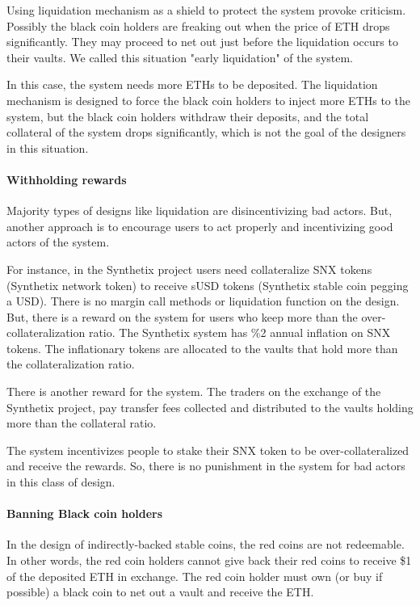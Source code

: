 Using liquidation mechanism as a shield to protect the system provoke criticism. Possibly the black coin holders are freaking out when the price of ETH drops significantly. They may proceed to net out just before the liquidation occurs to their vaults. We called this situation "early liquidation" of the system. 

In this case, the system needs more ETHs to be deposited. The liquidation mechanism is designed to force the black coin holders to inject more ETHs to the system, but the black coin holders withdraw their deposits, and the total collateral of the system drops significantly, which is not the goal of the designers in this situation.

\paragraph{Withholding rewards}

Majority types of designs like liquidation are disincentivizing bad actors. But, another approach is to encourage users to act properly and incentivizing good actors of the system.

For instance, in the Synthetix project users need collateralize SNX tokens (Synthetix network token) to receive sUSD tokens (Synthetix stable coin pegging a USD). There is no margin call methods or liquidation function on the design. But, there is a reward on the system for users who keep more than the over-collateralization ratio. 
The Synthetix system has \%2 annual inflation on SNX tokens. The inflationary tokens are allocated to the vaults that hold more than the collateralization ratio.

There is another reward for the system. The traders on the exchange of the Synthetix project, pay transfer fees collected and distributed to the vaults holding more than the collateral ratio.

The system incentivizes people to stake their SNX token to be over-collateralized and receive the rewards. So, there is no punishment in the system for bad actors in this class of design.

\paragraph{Banning Black coin holders}

In the design of indirectly-backed stable coins, the red coins are not redeemable. In other words, the red coin holders cannot give back their red coins to receive \$1 of the deposited ETH in exchange. The red coin holder must own (or buy if possible) a black coin to net out a vault and receive the ETH.

